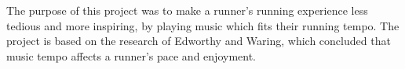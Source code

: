 The purpose of this project was to make a runner's running experience less tedious and more inspiring, by playing music which fits their running tempo. The project is based on the research of Edworthy and Waring, which concluded that music tempo affects a runner's pace and enjoyment.